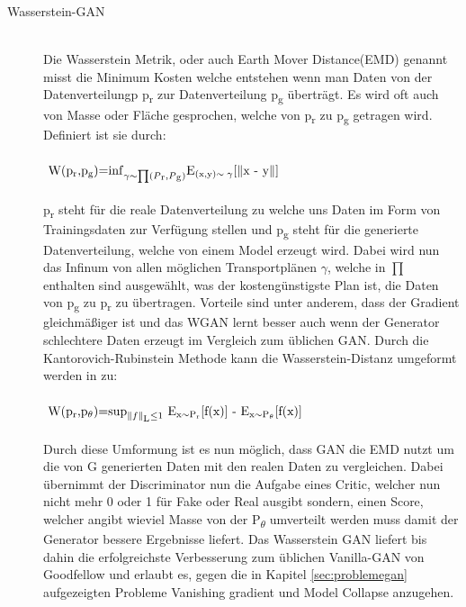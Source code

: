 \documentclass{llncs}
\begin{document}
\begin{description}
\item[Wasserstein-GAN]
~\\
Die Wasserstein Metrik, oder auch Earth Mover Distance(EMD) genannt misst die Minimum Kosten welche entstehen wenn man Daten von der Datenverteilungp p\textsubscript{r} zur Datenverteilung p\textsubscript{g} überträgt. Es wird oft auch von Masse oder Fläche gesprochen, welche von p\textsubscript{r} zu p\textsubscript{g} getragen wird. Definiert ist sie durch:
\\\\
\begin{math} 
$
W(p\textsubscript{r},p\textsubscript{g})=$\inf_{\gamma\sim\prod(P\textsubscript{r},P\textsubscript{g})}$E\textsubscript{(x,y)$\sim\gamma$}[$\parallel$x - y$\parallel$]
$
\end{math}
\\\\
p\textsubscript{r} steht für die reale Datenverteilung zu welche uns Daten im Form von Trainingsdaten zur Verfügung stellen und p\textsubscript{g} steht für die generierte Datenverteilung, welche von einem Model erzeugt wird. Dabei wird nun das Infinum von allen möglichen Transportplänen $\gamma$, welche in $\prod$ enthalten sind ausgewählt, was der kostengünstigste Plan ist, die Daten von p\textsubscript{g} zu p\textsubscript{r} zu übertragen. Vorteile sind unter anderem, dass der Gradient gleichmäßiger ist und das WGAN lernt besser auch wenn der Generator schlechtere Daten erzeugt im Vergleich zum üblichen GAN\cite{wasser}. Durch die Kantorovich-Rubinstein Methode kann die Wasserstein-Distanz umgeformt werden in zu:
\\\\
\begin{math} 
$
W(p\textsubscript{r},p\textsubscript{$\theta$})=$\sup_{\parallel f \parallel \textsubscript{L}\leq 1}$ E\textsubscript{x$\sim$P\textsubscript{r}}[f(x)] - E\textsubscript{x$\sim$P\textsubscript{$\theta$}}[f(x)]
$
\end{math}
\\\\
Durch diese Umformung ist es nun möglich, dass GAN die EMD nutzt um die von G generierten Daten mit den realen Daten zu vergleichen. Dabei übernimmt der Discriminator nun die Aufgabe eines Critic, welcher nun nicht mehr 0 oder 1 für Fake oder Real ausgibt sondern, einen Score, welcher angibt wieviel Masse von der P\textsubscript{$\theta$} umverteilt werden muss damit der Generator bessere Ergebnisse liefert. Das Wasserstein GAN liefert bis dahin die erfolgreichste Verbesserung zum üblichen Vanilla-GAN von Goodfellow und erlaubt es, gegen die in Kapitel \ref{sec:problemegan} aufgezeigten Probleme Vanishing gradient und Model Collapse anzugehen\cite{wasser}. 
\end{description}
\newpage
\end{document}
